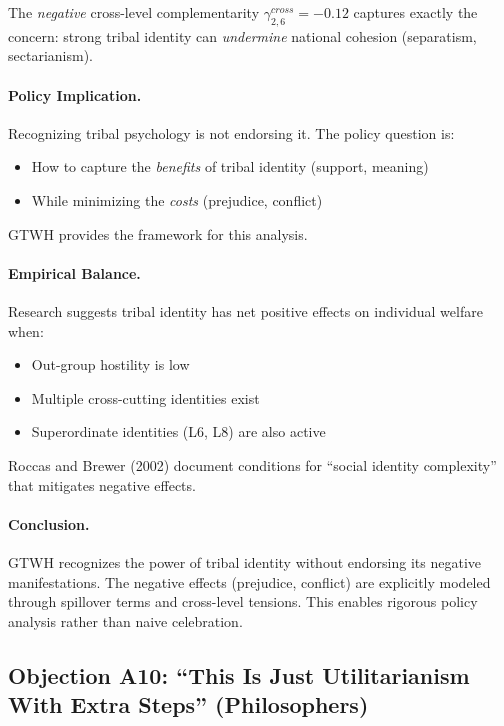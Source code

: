 \documentclass[12pt,a4paper]{article}
\begin{document}
The \textit{negative} cross-level complementarity $\gamma^{cross}_{2,6} = -0.12$ 
captures exactly the concern: strong tribal identity can \textit{undermine} 
national cohesion (separatism, sectarianism).

\paragraph{Policy Implication.}

Recognizing tribal psychology is not endorsing it. The policy question is:
\begin{itemize}[nosep]
\item How to capture the \textit{benefits} of tribal identity (support, meaning)
\item While minimizing the \textit{costs} (prejudice, conflict)
\end{itemize}

GTWH provides the framework for this analysis.

\paragraph{Empirical Balance.}

Research suggests tribal identity has net positive effects on individual 
welfare when:
\begin{itemize}[nosep]
\item Out-group hostility is low
\item Multiple cross-cutting identities exist
\item Superordinate identities (L6, L8) are also active
\end{itemize}

Roccas and Brewer (2002) document conditions for ``social identity complexity'' 
that mitigates negative effects.

\paragraph{Conclusion.}

GTWH recognizes the power of tribal identity without endorsing its negative 
manifestations. The negative effects (prejudice, conflict) are explicitly 
modeled through spillover terms and cross-level tensions. This enables 
rigorous policy analysis rather than naive celebration.

\subsection{Objection A10: ``This Is Just Utilitarianism With Extra Steps'' (Philosophers)}
\label{app:utilitarianism}
\end{document}
